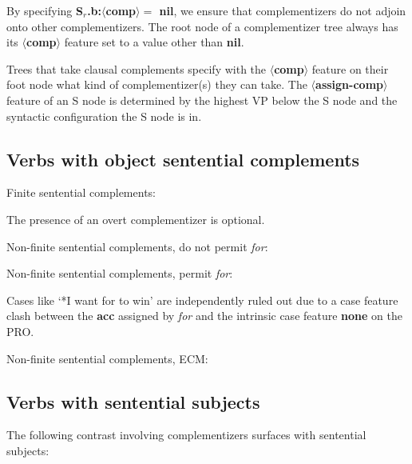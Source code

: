 By specifying {\bf S$_{r}$.b:$\langle$comp$\rangle =$ nil}, we ensure that
complementizers do not adjoin onto other complementizers. The root node
of a complementizer tree always has its {\bf $\langle$comp$\rangle$} feature
set to a value other than {\bf nil}.

Trees that take clausal complements specify with the {\bf $\langle$comp$\rangle$} feature
on their foot node what kind of complementizer(s) they can take. 
The {\bf $\langle$assign-comp$\rangle$} feature of an S node is determined 
by the highest VP below the S node and the syntactic configuration
the S node is in. 

\subsection{Verbs with object sentential complements}
Finite sentential complements:


The presence of an overt complementizer is optional.

Non-finite sentential complements, do not permit {\em for}:


Non-finite sentential complements, permit {\em for}:


Cases like `*I want for to win' are independently ruled out due to a 
case feature clash between the {\bf acc} assigned by {\em for} and the
intrinsic case feature {\bf none} on the PRO.

Non-finite sentential complements, ECM:



\subsection{Verbs with sentential subjects}
The following contrast involving complementizers surfaces with sentential
subjects:

